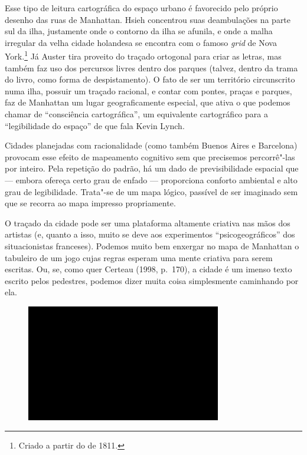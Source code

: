 Esse tipo de leitura cartográfica do espaço urbano é favorecido pelo
próprio desenho das ruas de Manhattan. Hsieh concentrou suas
deambulações na parte sul da ilha, justamente onde o contorno da ilha se
afunila, e onde a malha irregular da velha cidade holandesa se encontra
com o famoso \emph{grid} de Nova York.\footnote{Criado a partir do
  {} de 1811.} Já Auster tira proveito do
traçado ortogonal para criar as letras, mas também faz uso dos percursos
livres dentro dos parques (talvez, dentro da trama do livro, como forma
de despistamento). O fato de ser um território circunscrito numa ilha,
possuir um traçado racional, e contar com pontes, praças e parques, faz
de Manhattan um lugar geograficamente especial, que ativa o que podemos
chamar de ``consciência cartográfica'', um equivalente cartográfico para
a ``legibilidade do espaço'' de que fala Kevin Lynch.

Cidades planejadas com racionalidade (como também Buenos Aires e
Barcelona) provocam esse efeito de mapeamento cognitivo sem que
precisemos percorrê"-las por inteiro. Pela repetição do padrão, há um
dado de previsibilidade espacial que --- embora ofereça certo grau de
enfado --- proporciona conforto ambiental e alto grau de legibilidade.
Trata"-se de um mapa lógico, passível de ser imaginado sem que se recorra
ao mapa impresso propriamente.

O traçado da cidade pode ser uma plataforma altamente criativa nas mãos
dos artistas (e, quanto a isso, muito se deve aos experimentos
``psicogeográficos'' dos situacionistas franceses). Podemos muito bem
enxergar no mapa de Manhattan o tabuleiro de um jogo cujas regras
esperam uma mente criativa para serem escritas. Ou, se, como quer
Certeau (1998, p.~170), a cidade é um imenso texto escrito pelos
pedestres, podemos dizer muita coisa simplesmente caminhando por ela.

\begin{figure}[!ht]
\centering
 \includegraphics[width=85mm]{./imgs/im1.jpg}
\caption{\tiny{}}
\end{figure}


